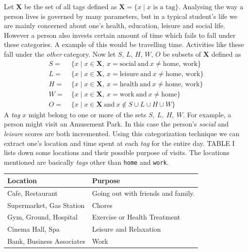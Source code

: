 \documentclass[conference]{IEEEtran}
\begin{document}
Let $\mathbf{X}$ be the set of all tags defined as $\mathbf{X} = \{x \mid x\text{ is a tag}\}$. Analysing the way a person lives is governed by many parameters, but in a typical student\rq s life we are mainly concerned about one\rq s health, education, leisure and social life. However a person also invests certain amount of time which fails to fall under these categories. A example of this would be travelling time. Activities like these fall under the \textit{other} category. Now let $S$, $L$, $H$, $W$, $O$ be subsets of $\mathbf{X}$ defined as
\begin{align*}
S =\ &\{x \mid x \in \mathbf{X},\ x = \text{social}\ \textrm{and}\ x \neq \text{home, work}\} \\
L =\ &\{x \mid x \in \mathbf{X},\ x = \text{leisure}\ \textrm{and}\ x \neq \text{home, work}\} \\
H =\ &\{x \mid x \in \mathbf{X},\ x = \text{health}\ \textrm{and}\ x \neq \text{home, work}\} \\
W =\ &\{x \mid x \in \mathbf{X},\ x = \text{work}\ \textrm{and}\ x \neq \text{home}\} \\
O =\ & \{x \mid x \in \mathbf{X}\ \textrm{and}\ x \notin S\cup L\cup H\cup W \}
\end{align*}
A \textit{tag} $x$ might belong to one or more of the sets $S,\ L,\ H,\ W$. For example, a person might visit an Amusement Park. In this case the person\rq s \textit{social} and \textit{leisure} scores are both incremented. Using this categorization technique we can extract one\rq s location and time spent at each \textit{tag} for the entire day. TABLE I lists down some locations and their possible purpose of visits. The locations mentioned are basically \textit{tags} other than \texttt{home} and \texttt{work}.
\begin{table}
\small
{}
\begin{center}
\def\arraystretch{1.7}
\begin{tabular}{|l|l|}
\hline
 \bf Location & \bf Purpose \\
 \hline
 Cafe, Restaurant & Going out with friends and family. \\
 \hline
 Supermarket, Gas Station & Chores \\
 \hline
 Gym, Ground, Hospital & Exercise or Health Treatment \\
 \hline
 Cinema Hall, Spa & Leisure and Relaxation \\
\hline
Bank, Business Associates & Work \\
\hline
\end{tabular}
\end{center}
\end{table}
\end{document}
